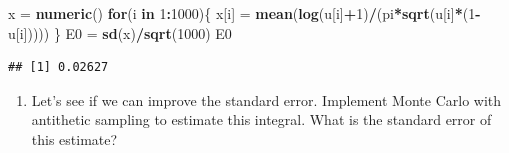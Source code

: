 \documentclass[
]{article}
\newenvironment{Shaded}{\begin{snugshade}}{\end{snugshade}}
\newcommand{\ControlFlowTok}[1]{\textcolor[rgb]{0.13,0.29,0.53}{\textbf{#1}}}
\newcommand{\DecValTok}[1]{\textcolor[rgb]{0.00,0.00,0.81}{#1}}
\newcommand{\KeywordTok}[1]{\textcolor[rgb]{0.13,0.29,0.53}{\textbf{#1}}}
\newcommand{\NormalTok}[1]{#1}
\newcommand{\OperatorTok}[1]{\textcolor[rgb]{0.81,0.36,0.00}{\textbf{#1}}}
\newcommand{\StringTok}[1]{\textcolor[rgb]{0.31,0.60,0.02}{#1}}
\providecommand{\tightlist}{%
  \setlength{\itemsep}{0pt}\setlength{\parskip}{0pt}}
\begin{document}
\begin{Shaded}
\begin{Highlighting}[]
\NormalTok{x =}\StringTok{ }\KeywordTok{numeric}\NormalTok{()}
\ControlFlowTok{for}\NormalTok{(i }\ControlFlowTok{in} \DecValTok{1}\OperatorTok{:}\DecValTok{1000}\NormalTok{)\{}
\NormalTok{  x[i] =}\StringTok{ }\KeywordTok{mean}\NormalTok{(}\KeywordTok{log}\NormalTok{(u[i]}\OperatorTok{+}\DecValTok{1}\NormalTok{)}\OperatorTok{/}\NormalTok{(pi}\OperatorTok{*}\KeywordTok{sqrt}\NormalTok{(u[i]}\OperatorTok{*}\NormalTok{(}\DecValTok{1}\OperatorTok{-}\NormalTok{u[i]))))}
\NormalTok{\}}
\NormalTok{E0 =}\StringTok{ }\KeywordTok{sd}\NormalTok{(x)}\OperatorTok{/}\KeywordTok{sqrt}\NormalTok{(}\DecValTok{1000}\NormalTok{)}
\NormalTok{E0}
\end{Highlighting}
\end{Shaded}

\begin{verbatim}
## [1] 0.02627
\end{verbatim}

\begin{enumerate}
\def\labelenumi{\alph{enumi}.}
\setcounter{enumi}{1}
\tightlist
\item
  Let's see if we can improve the standard error. Implement Monte Carlo
  with antithetic sampling to estimate this integral. What is the
  standard error of this estimate?
\end{enumerate}
\end{document}
